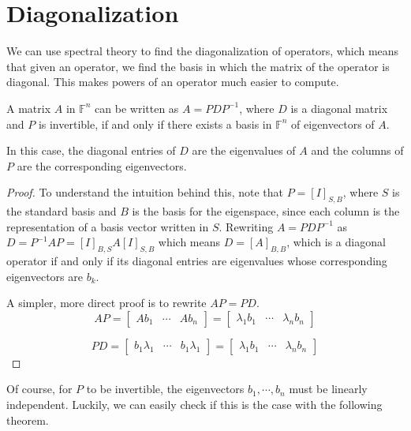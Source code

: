\section{Diagonalization}
We can use spectral theory to find the diagonalization of operators, which means that given an operator, we find the basis in which the matrix of the operator is diagonal. This makes powers of an operator much easier to compute. 

\begin{theorem}
A matrix $A$ in $\mathbb{F}^{n}$ can be written as $A = PDP^{-1}$, where $D$ is a diagonal matrix and $P$ is invertible, if and only if there exists a basis in $\mathbb{F}^{n}$ of eigenvectors of $A$. 

In this case, the diagonal entries of $D$ are the eigenvalues of $A$ and the columns of $P$ are the corresponding eigenvectors. 
\end{theorem}

\begin{proof}

To understand the intuition behind this, note that $P = [I]_{S, B}$, where $S$ is the standard basis and $B$ is the basis for the eigenspace, since each column is the representation of a basis vector written in $S$. Rewriting $A = PDP^{-1}$ as $D = P^{-1}AP = [I]_{B, S} A [I]_{S,B}$ which means $D = [A]_{B, B}$, which is a diagonal operator if and only if its diagonal entries are eigenvalues whose corresponding eigenvectors are $b_{k}$. 

A simpler, more direct proof is to rewrite $AP = PD$. 
$$AP = \begin{bmatrix}
Ab_{1} & \cdots & Ab_{n}
\end{bmatrix} = \begin{bmatrix}
\lambda_{1} b_{1} & \cdots & \lambda_{n} b_{n}
\end{bmatrix}$$

$$PD = \begin{bmatrix}
b_{1} \lambda_{1} & \cdots & b_{1} \lambda_{1}
\end{bmatrix} = \begin{bmatrix}
\lambda_{1} b_{1} & \cdots & \lambda_{n} b_{n}
\end{bmatrix}$$
\end{proof}

Of course, for $P$ to be invertible, the eigenvectors $b_{1}, \cdots, b_{n}$ must be linearly independent. Luckily, we can easily check if this is the case with the following theorem. 

